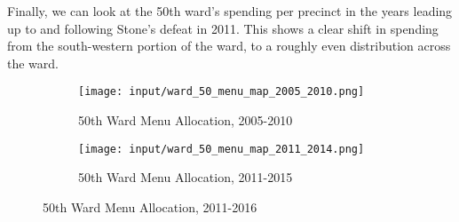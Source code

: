 Finally, we can look at the 50th ward's spending per precinct in the years leading up to and following Stone's defeat in 2011.
This shows a clear shift in spending from the south-western portion of the ward, to a roughly even distribution across the ward.

\begin{figure}[H]
    \centering
    \begin{subfigure}[b]{0.45\textwidth} %
    \texttt{[image: input/ward\_50\_menu\_map\_2005\_2010.png]}
    \caption{50th Ward Menu Allocation, 2005-2010}
    \end{subfigure}
    \hfill %
    \begin{subfigure}[b]{0.45\textwidth}
    \texttt{[image: input/ward\_50\_menu\_map\_2011\_2014.png]}
    \caption{50th Ward Menu Allocation, 2011-2015}
    \end{subfigure}
    \caption{50th Ward Menu Allocation, 2011-2016}
    \label{fig:stone_support_maps}
\end{figure}